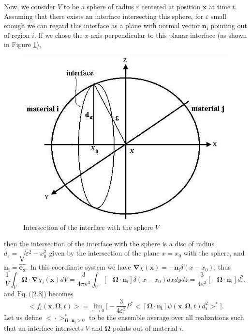 \documentclass[12pt]{article}
\newcommand{\ep}{\varepsilon}
\newcommand{\bl}{\big<}
\newcommand{\bg}{\big>}
\begin{document}
Now, we consider $V$ to be a sphere of radius $\ep$ centered at position $\bm x$ at time $t$.
Assuming that there exists an interface intersecting this sphere, for $\ep$ small enough we can regard this interface as a plane with normal vector $\bm{n_i}$ pointing out of region $i$.
If we chose the $x$-axis perpendicular to this planar interface (as shown in Figure \ref{fig_1}),
\begin{figure}[t]
\centering
\includegraphics[height=7 cm,width=8.75 cm]{fig_1.jpeg}
\caption{Intersection of the interface with the sphere $V$}\label{fig_1}
\end{figure}
then the intersection of the interface with the sphere is a disc of radius $d_{\ep}=\sqrt{\ep^2-x_0^2}$ given by the intersection of the plane $x=x_0$ with the sphere, and $\bm{n_i} = \hat{\bm{e_x}}$.
In this coordinate system we have $\bm\nabla \chi(\bm x) = -\bm{n_i}\delta(x-x_0)$; thus
\begin{equation}
\frac{1}{V}\int_{V}\bm\Omega\cdot\bm\nabla\chi_i(\bm x)dV =
\frac{3}{4\pi\ep^3}\int_{V}[-\bm\Omega\cdot\bm{n_i}]\delta(x-x_0)dxdydz
 = \frac{3}{4\ep^3}[-\bm\Omega\cdot\bm{n_i}]d_{\ep}^2,
\end{equation}
 and $\textrm{Eq.}\ ($\ref{2.8}) becomes
\begin{equation}\label{2.11}
\bl f_i(\bm x,\bm\Omega,t) \bg = \lim_{\ep\rightarrow 0}\bigg[-\frac{3}{4\ep^3}
P^*\bigg<[\bm\Omega\cdot\bm{n_i}]
\psi(\bm x,\bm\Omega,t)d_{\ep}^2\bigg>^*\bigg].
\end{equation}
 Let us define $\bl \cdot \bg^*_{\bm\Omega\cdot\bm{n_i}>0}$ to be the ensemble average over all realizations such that an interface intersects $V$ and $\bm\Omega$ points out of material $i$.
\end{document}

